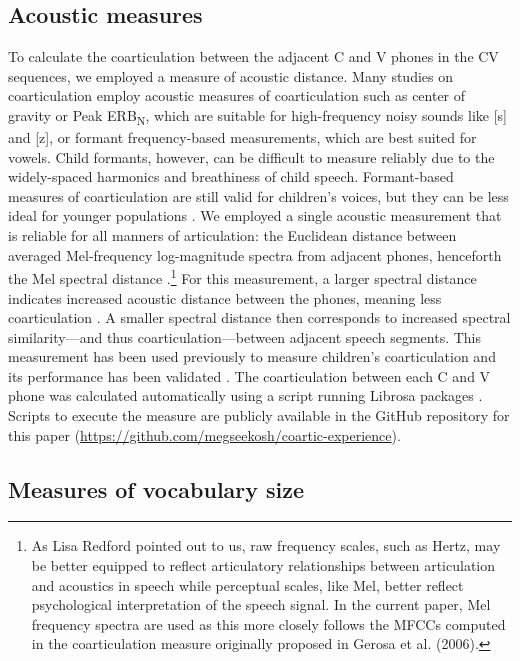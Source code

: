 \documentclass[a4paper,man,natbib,donotrepeattitle, apacite]{apa6}
\begin{document}
\subsection{Acoustic measures}

To calculate the coarticulation between the adjacent C and V phones in the CV sequences, we employed a measure of acoustic distance. Many studies on coarticulation employ acoustic measures of coarticulation such as center of gravity or Peak ERB\textsubscript{N}, which are suitable for high-frequency noisy sounds like [s] and [z], or formant frequency-based measurements, which are best suited for vowels. Child formants, however, can be difficult to measure reliably due to the widely-spaced harmonics and breathiness of child speech. Formant-based measures of coarticulation are still valid for children's voices, but they can be less ideal for younger populations \cite{leeAcousticsChildrenSpeech1999}. We employed a single acoustic measurement that is reliable for all manners of articulation: the Euclidean distance between averaged Mel-frequency log-magnitude spectra from adjacent phones, henceforth the Mel spectral distance \cite{cychoszSpectralTemporalMeasures2019,gerosaAnalyzingChildrenSpeech2006}.\footnote{As Lisa Redford pointed out to us, raw frequency scales, such as Hertz, may be better equipped to reflect articulatory relationships between articulation and acoustics in speech while perceptual scales, like Mel, better reflect psychological interpretation of the speech signal. In the current paper, Mel frequency spectra are used as this more closely follows the MFCCs computed in the coarticulation measure originally proposed in Gerosa et al. (2006).} For this measurement, a larger spectral distance indicates increased acoustic distance between the phones, meaning less coarticulation \cite{gerosaAnalyzingChildrenSpeech2006}. A smaller spectral distance then corresponds to increased spectral similarity---and thus coarticulation---between adjacent speech segments. This measurement has been used previously to measure children’s coarticulation \cite{gerosaAnalyzingChildrenSpeech2006} and its performance has been validated \cite{cychoszSpectralTemporalMeasures2019}. The coarticulation between each C and V phone was calculated automatically using a script running Librosa packages \cite{mcfeeLibrosaAudioMusic2015}. Scripts to execute the measure are publicly available in the GitHub repository for this paper (\url{https://github.com/megseekosh/coartic-experience}). 

\subsection{Measures of vocabulary size}
\end{document}
